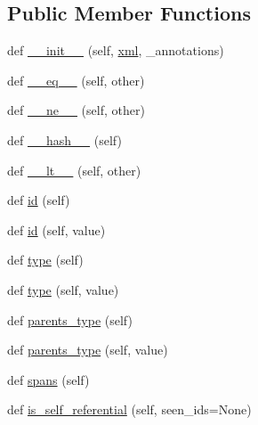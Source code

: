\subsection*{Public Member Functions}
\begin{DoxyCompactItemize}
\item 
def \hyperlink{classtask6_1_1anafora_1_1AnaforaAnnotation_a7017a1f28088e9ec527d5ad5e8de5423}{\+\_\+\+\_\+init\+\_\+\+\_\+} (self, \hyperlink{classtask6_1_1anafora_1_1__XMLWrapper_abed00085815402c05f9569d349f8dfda}{xml}, \+\_\+annotations)
\item 
def \hyperlink{classtask6_1_1anafora_1_1AnaforaAnnotation_af48bd36508464c8b1ca5eacd8db4e5fa}{\+\_\+\+\_\+eq\+\_\+\+\_\+} (self, other)
\item 
def \hyperlink{classtask6_1_1anafora_1_1AnaforaAnnotation_a19a99ad9029f5f1d85e6003aac8dc880}{\+\_\+\+\_\+ne\+\_\+\+\_\+} (self, other)
\item 
def \hyperlink{classtask6_1_1anafora_1_1AnaforaAnnotation_a651ee72ba8c8798c88987839157c8dfe}{\+\_\+\+\_\+hash\+\_\+\+\_\+} (self)
\item 
def \hyperlink{classtask6_1_1anafora_1_1AnaforaAnnotation_ae7d2ab7167d62da9e980870000cb2849}{\+\_\+\+\_\+lt\+\_\+\+\_\+} (self, other)
\item 
def \hyperlink{classtask6_1_1anafora_1_1AnaforaAnnotation_a405add792d31a5e67625031b25c55f06}{id} (self)
\item 
def \hyperlink{classtask6_1_1anafora_1_1AnaforaAnnotation_a5265386d9fe9c375916dd433c67a1210}{id} (self, value)
\item 
def \hyperlink{classtask6_1_1anafora_1_1AnaforaAnnotation_abfab999fa7e7b3f3aa75654c4f2d4d5e}{type} (self)
\item 
def \hyperlink{classtask6_1_1anafora_1_1AnaforaAnnotation_a05589d07d3b1ea053a803f7ffa8df6f9}{type} (self, value)
\item 
def \hyperlink{classtask6_1_1anafora_1_1AnaforaAnnotation_a7adcd52d2563a475e0f43185530368e8}{parents\+\_\+type} (self)
\item 
def \hyperlink{classtask6_1_1anafora_1_1AnaforaAnnotation_acf87c927ff3b0da384aeecd38aa9c282}{parents\+\_\+type} (self, value)
\item 
def \hyperlink{classtask6_1_1anafora_1_1AnaforaAnnotation_aa4bd5ae9239ee5b8b5d57b24d4cef3cd}{spans} (self)
\item 
def \hyperlink{classtask6_1_1anafora_1_1AnaforaAnnotation_a9c2d06777fb1ffa9b2d340f8c22df7f0}{is\+\_\+self\+\_\+referential} (self, seen\+\_\+ids=None)
\end{DoxyCompactItemize}
